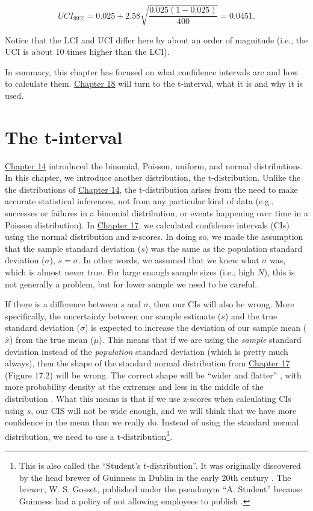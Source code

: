 \documentclass[
]{scrbook}
\begin{document}
\[UCI_{99\%} = 0.025 + 2.58 \sqrt{\frac{0.025\left(1 - 0.025\right)}{400}} = 0.0451.\]

Notice that the LCI and UCI differ here by about an order of magnitude (i.e., the UCI is about 10 times higher than the LCI).

In summary, this chapter has focused on what confidence intervals are and how to calculate them.
\protect\hyperlink{Chapter_18}{Chapter 18} will turn to the t-interval, what it is and why it is used.

\hypertarget{Chapter_18}{%
\chapter{The t-interval}\label{Chapter_18}}

\protect\hyperlink{Chapter_14}{Chapter 14} introduced the binomial, Poisson, uniform, and normal distributions.
In this chapter, we introduce another distribution, the t-distribution.
Unlike the the distributions of \protect\hyperlink{Chapter_14}{Chapter 14}, the t-distribution arises from the need to make accurate statistical inferences, not from any particular kind of data (e.g., successes or failures in a binomial distribution, or events happening over time in a Poisson distribution).
In \protect\hyperlink{Chapter_17}{Chapter 17}, we calculated confidence intervals (CIs) using the normal distribution and z-scores.
In doing so, we made the assumption that the sample standard deviation (\(s\)) was the same as the population standard deviation (\(\sigma\)), \(s = \sigma\).
In other words, we assumed that we knew what \(\sigma\) was, which is almost never true.
For large enough sample sizes (i.e., high \(N\)), this is not generally a problem, but for lower sample we need to be careful.

If there is a difference between \(s\) and \(\sigma\), then our CIs will also be wrong.
More specifically, the uncertainty between our sample estimate (\(s\)) and the true standard deviation (\(\sigma\)) is expected to increase the deviation of our sample mean (\(\bar{x}\)) from the true mean (\(\mu\)).
This means that if we are using the \emph{sample} standard deviation instead of the \emph{population} standard deviation (which is pretty much always), then the shape of the standard normal distribution from \protect\hyperlink{Chapter_17}{Chapter 17} (Figure 17.2) will be wrong.
The correct shape will be ``wider and flatter'' \citep{Sokal1995}, with more probability density at the extremes and less in the middle of the distribution \citep{Box1978}.
What this means is that if we use z-scores when calculating CIs using \(s\), our CIS will not be wide enough, and we will think that we have more confidence in the mean than we really do.
Instead of using the standard normal distribution, we need to use a t-distribution\footnote{This is also called the ``Student's t-distribution''. It was originally discovered by the head brewer of Guinness in Dublin in the early 20th century \citep{Box1978}. The brewer, W. S. Gosset, published under the pseudonym ``A. Student'' because Guinness had a policy of not allowing employees to publish \citep{Miller2004}.}.
\end{document}
